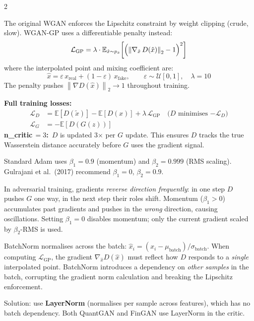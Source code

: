 \documentclass[10pt]{article}
\newcommand{\navybox}[2]{\begin{tcolorbox}[mybox={Navy}{LBg},title={#1}]#2\end{tcolorbox}}
\newcommand{\tealbox}[2]{\begin{tcolorbox}[mybox={Teal}{LBg},title={#1}]#2\end{tcolorbox}}
\newcommand{\amberbox}[2]{\begin{tcolorbox}[mybox={Amber}{ABg},title={#1}]#2\end{tcolorbox}}
\newcommand{\E}{\mathbb{E}}
\newcommand{\norm}[1]{\left\|#1\right\|}
\begin{document}
\begin{multicols}{2}
\columnbreak

\tealbox{Gradient Penalty (Gulrajani et al., 2017)}{%
The original WGAN enforces the Lipschitz constraint by weight clipping (crude, slow).
WGAN-GP uses a differentiable penalty instead:
\begin{equation*}
  \mathcal{L}_\text{GP}
  = \lambda \cdot \E_{\hat{x} \sim p_{\hat{x}}}\!\left[
      \Bigl(\norm{\nabla_{\hat{x}}\, D(\hat{x})}_2 - 1\Bigr)^2\right]
\end{equation*}
where the interpolated point and mixing coefficient are:
\begin{equation*}
  \hat{x} = \varepsilon\, x_\text{real} + (1-\varepsilon)\, x_\text{fake},
  \qquad \varepsilon \sim \mathcal{U}[0,1],\quad \lambda = 10
\end{equation*}
The penalty pushes $\norm{\nabla D(\hat{x})}_2 \to 1$ throughout training.

\textbf{Full training losses:}
\begin{align*}
  \mathcal{L}_D &= \E[D(\tilde{x})] - \E[D(x)] + \lambda\,\mathcal{L}_\text{GP}
                   \quad\text{($D$ minimises $-\mathcal{L}_D$)} \\
  \mathcal{L}_G &= -\E[D(G(z))]
\end{align*}
\textbf{n\_critic\,$=3$:}\ $D$ is updated 3$\times$ per $G$ update. This ensures $D$ tracks the true Wasserstein distance accurately before $G$ uses the gradient signal.}

\navybox{Adam Optimiser: Why $\beta_1 = 0$?}{%
Standard Adam uses $\beta_1 = 0.9$ (momentum) and $\beta_2 = 0.999$ (RMS scaling). Gulrajani et al.\ (2017) recommend $\beta_1 = 0$, $\beta_2 = 0.9$.

In adversarial training, gradients \emph{reverse direction frequently}: in one step $D$ pushes $G$ one way, in the next step their roles shift. Momentum ($\beta_1 > 0$) accumulates past gradients and pushes in the \emph{wrong} direction, causing oscillations. Setting $\beta_1 = 0$ disables momentum; only the current gradient scaled by $\beta_2$-RMS is used.}

\amberbox{Why No BatchNorm in the WGAN-GP Critic?}{%
BatchNorm normalises across the batch: $\hat{x}_i = (x_i - \mu_\text{batch})/\sigma_\text{batch}$.
When computing $\mathcal{L}_\text{GP}$, the gradient $\nabla_{\hat{x}} D(\hat{x})$ must reflect how $D$ responds to a \emph{single} interpolated point. BatchNorm introduces a dependency on \emph{other samples} in the batch, corrupting the gradient norm calculation and breaking the Lipschitz enforcement.

Solution: use \textbf{LayerNorm} (normalises per sample across features), which has no batch dependency. Both QuantGAN and FinGAN use LayerNorm in the critic.}

\end{multicols}
\end{document}
